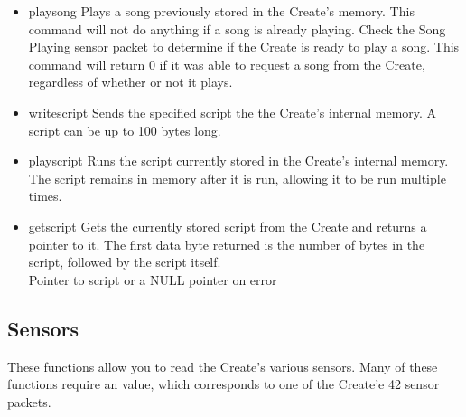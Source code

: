 \documentclass {article}
\begin{document}
\begin {itemize}
\item {} {playsong} Plays a song
  previously stored in the Create's memory.  This command will not do
  anything if a song is already playing.  Check the Song Playing
  sensor packet to determine if the Create is ready to play a song.
  This command will return 0 if it was able to request a song from
  the Create, regardless of whether or not it plays. \\
  \retnorm
        
\item {}
  {writescript} Sends the specified script the the Create's internal
  memory.  A script can be up to 100
  bytes long. \\
  \retnorm

\item {} {playscript} Runs the script
  currently stored in the Create's internal memory.  The script
  remains in
  memory after it is run, allowing it to be run multiple times. \\
  \retnorm

\item {} {getscript} Gets the currently stored
  script from the Create and returns a pointer to it.  The first
  data byte returned is the number of bytes in the script, followed by the script itself. \\
  \ret Pointer to script or a NULL pointer on error
\end {itemize}

\subsection {Sensors}
These functions allow you to read the Create's various sensors.  Many
of these functions require an \oisensor value, which corresponds to
one of the Create'e 42 sensor packets.
\end{document}
